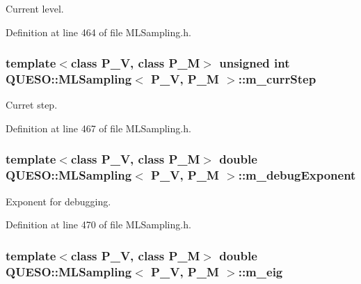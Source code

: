 Current level. 



Definition at line 464 of file M\-L\-Sampling.\-h.

\hypertarget{class_q_u_e_s_o_1_1_m_l_sampling_a1b1f8ccb4823bdfa26ec652f0807c63e}{
\subsubsection[{m\-\_\-curr\-Step}]{\setlength{\rightskip}{0pt plus 5cm}template$<$class P\-\_\-\-V, class P\-\_\-\-M$>$ unsigned int {\bf Q\-U\-E\-S\-O\-::\-M\-L\-Sampling}$<$ P\-\_\-\-V, P\-\_\-\-M $>$\-::m\-\_\-curr\-Step\hspace{0.3cm}{\ttfamily [private]}}}\label{class_q_u_e_s_o_1_1_m_l_sampling_a1b1f8ccb4823bdfa26ec652f0807c63e}


Curret step. 



Definition at line 467 of file M\-L\-Sampling.\-h.

\hypertarget{class_q_u_e_s_o_1_1_m_l_sampling_abdd5cd35419283c33cc40a77d0f4f07f}{
\subsubsection[{m\-\_\-debug\-Exponent}]{\setlength{\rightskip}{0pt plus 5cm}template$<$class P\-\_\-\-V, class P\-\_\-\-M$>$ double {\bf Q\-U\-E\-S\-O\-::\-M\-L\-Sampling}$<$ P\-\_\-\-V, P\-\_\-\-M $>$\-::m\-\_\-debug\-Exponent\hspace{0.3cm}{\ttfamily [private]}}}\label{class_q_u_e_s_o_1_1_m_l_sampling_abdd5cd35419283c33cc40a77d0f4f07f}


Exponent for debugging. 



Definition at line 470 of file M\-L\-Sampling.\-h.

\hypertarget{class_q_u_e_s_o_1_1_m_l_sampling_abec7f8cf9da08bc5c0a20d99fa4570af}{
\subsubsection[{m\-\_\-eig}]{\setlength{\rightskip}{0pt plus 5cm}template$<$class P\-\_\-\-V, class P\-\_\-\-M$>$ double {\bf Q\-U\-E\-S\-O\-::\-M\-L\-Sampling}$<$ P\-\_\-\-V, P\-\_\-\-M $>$\-::m\-\_\-eig\hspace{0.3cm}{\ttfamily [private]}}}\label{class_q_u_e_s_o_1_1_m_l_sampling_abec7f8cf9da08bc5c0a20d99fa4570af}



